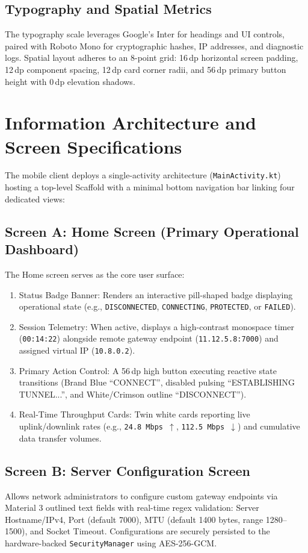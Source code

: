\subsection{Typography and Spatial Metrics}
The typography scale leverages Google's Inter for headings and UI controls, paired with Roboto Mono for cryptographic hashes, IP addresses, and diagnostic logs. Spatial layout adheres to an 8-point grid: 16\,dp horizontal screen padding, 12\,dp component spacing, 12\,dp card corner radii, and 56\,dp primary button height with 0\,dp elevation shadows.

\section{Information Architecture and Screen Specifications}
\label{sec:screen_specifications}

The mobile client deploys a single-activity architecture (\texttt{MainActivity.kt}) hosting a top-level Scaffold with a minimal bottom navigation bar linking four dedicated views:

\subsection{Screen A: Home Screen (Primary Operational Dashboard)}
The Home screen serves as the core user surface:
\begin{enumerate}
    \item Status Badge Banner: Renders an interactive pill-shaped badge displaying operational state (e.g., \texttt{DISCONNECTED}, \texttt{CONNECTING}, \texttt{PROTECTED}, or \texttt{FAILED}).
    \item Session Telemetry: When active, displays a high-contrast monospace timer (\texttt{00:14:22}) alongside remote gateway endpoint (\texttt{11.12.5.8:7000}) and assigned virtual IP (\texttt{10.8.0.2}).
    \item Primary Action Control: A 56\,dp high button executing reactive state transitions (Brand Blue ``CONNECT'', disabled pulsing ``ESTABLISHING TUNNEL...'', and White/Crimson outline ``DISCONNECT'').
    \item Real-Time Throughput Cards: Twin white cards reporting live uplink/downlink rates (e.g., \texttt{24.8\,Mbps $\uparrow$}, \texttt{112.5\,Mbps $\downarrow$}) and cumulative data transfer volumes.
\end{enumerate}

\subsection{Screen B: Server Configuration Screen}
Allows network administrators to configure custom gateway endpoints via Material 3 outlined text fields with real-time regex validation: Server Hostname/IPv4, Port (default 7000), MTU (default 1400 bytes, range 1280--1500), and Socket Timeout. Configurations are securely persisted to the hardware-backed \texttt{SecurityManager} using AES-256-GCM.

